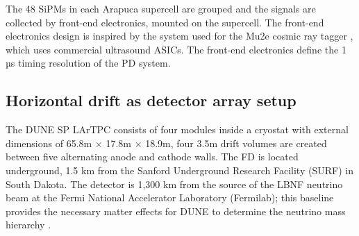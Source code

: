 \documentclass[a4paper,10pt,epsfig,epsf,amsfonts,amsmath]{article}
\begin{document}
The 48 SiPMs in each Arapuca supercell are grouped and the signals are collected by front-end electronics, mounted on the supercell. The front-end electronics design is inspired by the system used for the Mu2e cosmic ray tagger \cite{Bartoszek2015}, which uses commercial ultrasound ASICs. The front-end electronics define the 1 µs timing resolution of the PD system.

\subsection{Horizontal drift as detector array setup}

The DUNE SP LArTPC consists of four modules inside a cryostat with external dimensions of 65.8m × 17.8m × 18.9m, four 3.5m drift volumes are created between five alternating anode and cathode walls. The FD is located underground, 1.5 km from the Sanford Underground Research Facility (SURF) in South Dakota. The detector is 1,300 km from the source of the LBNF neutrino beam at the Fermi National Accelerator Laboratory (Fermilab); this baseline provides the necessary matter effects for DUNE to determine the neutrino mass hierarchy \cite{Abi_2020}.
\end{document}
